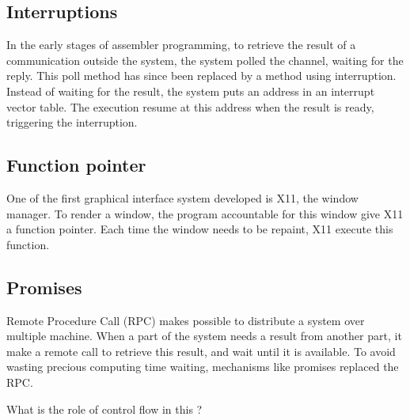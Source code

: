 \subsection{Interruptions}

In the early stages of assembler programming, to retrieve the result of a communication outside the system, the system polled the channel, waiting for the reply.
This poll method has since been replaced by a method using interruption.
Instead of waiting for the result, the system puts an address in an interrupt vector table.
The execution resume at this address when the result is ready, triggering the interruption.

\subsection{Function pointer}

One of the first graphical interface system developed is X11, the window manager.
To render a window, the program accountable for this window give X11 a function pointer.
Each time the window needs to be repaint, X11 execute this function.

\subsection{Promises}

Remote Procedure Call (RPC) makes possible to distribute a system over multiple machine.
When a part of the system needs a result from another part, it make a remote call to retrieve this result, and wait until it is available.
To avoid wasting precious computing time waiting, mechanisms like promises replaced the RPC.


What is the role of control flow in this ?

